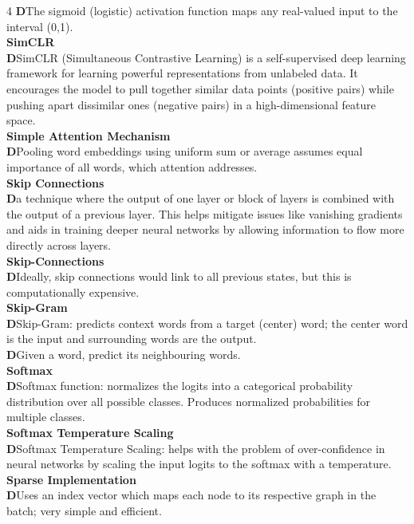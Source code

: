 \documentclass[8pt]{extarticle}
\newcommand{\dtag}{\textcolor{definitioncolor}{\tiny\textbf{D}}\;}
\begin{document}
\begin{multicols}{4}
\dtag The sigmoid (logistic) activation function maps any real-valued input to the interval (0,1).\\
\vspace{2pt}\textbf{SimCLR}\\
\dtag SimCLR (Simultaneous Contrastive Learning) is a self-supervised deep learning framework for learning powerful representations from unlabeled data. It encourages the model to pull together similar data points (positive pairs) while pushing apart dissimilar ones (negative pairs) in a high-dimensional feature space.\\
\vspace{2pt}\textbf{Simple Attention Mechanism}\\
\dtag Pooling word embeddings using uniform sum or average assumes equal importance of all words, which attention addresses.\\
\vspace{2pt}\textbf{Skip Connections}\\
\dtag a technique where the output of one layer or block of layers is combined with the output of a previous layer. This helps mitigate issues like vanishing gradients and aids in training deeper neural networks by allowing information to flow more directly across layers.\\
\vspace{2pt}\textbf{Skip-Connections}\\
\dtag Ideally, skip connections would link to all previous states, but this is computationally expensive.\\
\vspace{2pt}\textbf{Skip-Gram}\\
\dtag Skip-Gram: predicts context words from a target (center) word; the center word is the input and surrounding words are the output.\\
\dtag Given a word, predict its neighbouring words.\\
\vspace{2pt}\textbf{Softmax}\\
\dtag Softmax function: normalizes the logits into a categorical probability distribution over all possible classes. Produces normalized probabilities for multiple classes.\\
\vspace{2pt}\textbf{Softmax Temperature Scaling}\\
\dtag Softmax Temperature Scaling: helps with the problem of over-confidence in neural networks by scaling the input logits to the softmax with a temperature.\\
\vspace{2pt}\textbf{Sparse Implementation}\\
\dtag Uses an index vector which maps each node to its respective graph in the batch; very simple and efficient.\\


\end{multicols}
\end{document}
